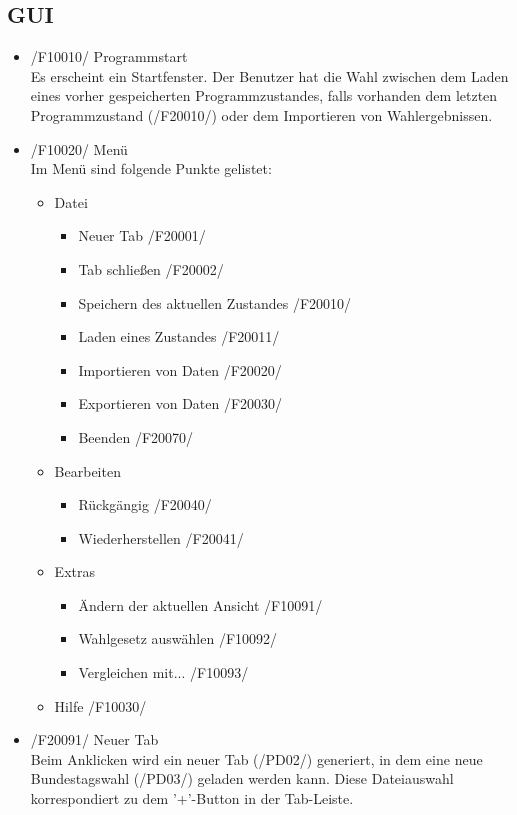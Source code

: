 \documentclass[10pt,a4paper]{article}
\begin{document}
\subsection{GUI}
\begin{itemize}
	\item /F10010/ Programmstart \hfill \\
	Es erscheint ein Startfenster. Der Benutzer hat die Wahl zwischen dem Laden eines vorher gespeicherten Programmzustandes, falls vorhanden dem letzten Programmzustand (/F20010/) oder dem Importieren von Wahlergebnissen.
	\item /F10020/ Menü \hfill \\
	Im Menü sind folgende Punkte gelistet:
	\begin{itemize}
		\item Datei
		\begin{itemize}
			\item Neuer Tab /F20001/
			\item Tab schließen /F20002/
			\item Speichern des aktuellen Zustandes /F20010/
			\item Laden eines Zustandes /F20011/
			\item Importieren von Daten /F20020/
			\item Exportieren von Daten /F20030/
			\item Beenden /F20070/
		\end{itemize}
		\item Bearbeiten
		\begin{itemize}
			\item Rückgängig /F20040/
			\item Wiederherstellen /F20041/
		\end{itemize}
		\item Extras
		\begin{itemize}
			\item Ändern der aktuellen Ansicht /F10091/
			\item Wahlgesetz auswählen /F10092/
			\item Vergleichen mit... /F10093/
		\end{itemize}
		\item Hilfe /F10030/
	\end{itemize}
	\item /F20091/ Neuer Tab \hfill \\
	Beim Anklicken wird ein neuer Tab (/PD02/) generiert, in dem eine neue Bundestagswahl (/PD03/) geladen werden kann. Diese Dateiauswahl korrespondiert zu dem '+'-Button in der Tab-Leiste.

\end{itemize}
\end{document}

